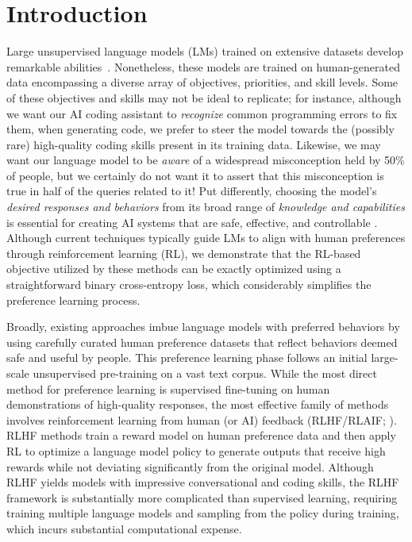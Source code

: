 \section{Introduction}
Large unsupervised language models (LMs) trained on extensive datasets develop remarkable abilities~\citep{chowdhery2022palm, brown2020language, touvron2023llama,bubeck2023sparks}. Nonetheless, these models are trained on human-generated data encompassing a diverse array of objectives, priorities, and skill levels. Some of these objectives and skills may not be ideal to replicate; for instance, although we want our AI coding assistant to \textit{recognize} common programming errors to fix them, when generating code, we prefer to steer the model towards the (possibly rare) high-quality coding skills present in its training data. Likewise, we may want our language model to be \textit{aware} of a widespread misconception held by 50\% of people, but we certainly do not want it to assert that this misconception is true in half of the queries related to it! Put differently, choosing the model's \emph{desired responses and behaviors} from its broad range of \textit{knowledge and capabilities} is essential for creating AI systems that are safe, effective, and controllable \citep{ouyang2022training}. Although current techniques typically guide LMs to align with human preferences through reinforcement learning (RL), we demonstrate that the RL-based objective utilized by these methods can be exactly optimized using a straightforward binary cross-entropy loss, which considerably simplifies the preference learning process.

Broadly, existing approaches imbue language models with preferred behaviors by using carefully curated human preference datasets that reflect behaviors deemed safe and useful by people. This preference learning phase follows an initial large-scale unsupervised pre-training on a vast text corpus. While the most direct method for preference learning is supervised fine-tuning on human demonstrations of high-quality responses, the most effective family of methods involves reinforcement learning from human (or AI) feedback (RLHF/RLAIF; \citep{christiano2017deep,bai2022constitutional}). RLHF methods train a reward model on human preference data and then apply RL to optimize a language model policy to generate outputs that receive high rewards while not deviating significantly from the original model. Although RLHF yields models with impressive conversational and coding skills, the RLHF framework is substantially more complicated than supervised learning, requiring training multiple language models and sampling from the policy during training, which incurs substantial computational expense.

